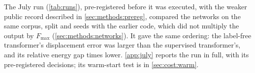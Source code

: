 The July run (\cref{tab:runs}), pre-registered before it was executed, with the weaker
public record described in \cref{sec:methods:prereg}, compared the networks on the same
corpus, split and seeds with the earlier code, which did not multiply the output by
$F_{\max}$ (\cref{sec:methods:networks}). It gave the same ordering: the label-free
transformer's displacement error was \numTwoFreeDispExcessAbs{} larger than the supervised
transformer's, and its relative energy gap \numTwoLabOverFreeGap{} times lower.
\ref{app:july} reports the run in full, with its pre-registered decisions; its warm-start
test is in \cref{sec:cost:warm}.
